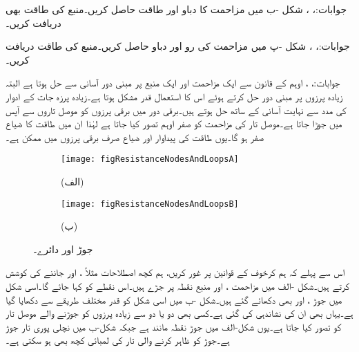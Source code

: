 جوابات:، ، 
شکل -ب میں مزاحمت کا دباو اور طاقت حاصل کریں۔منبع کی طاقت بھی دریافت کریں۔

جوابات:، ، 
شکل -پ میں مزاحمت کی رو اور دباو حاصل کریں۔منبع کی طاقت دریافت کریں۔

جوابات:، ، 
\FloatBarrier
{}
اوہم کے قانون سے ایک مزاحمت اور ایک منبع پر مبنی دور آسانی سے حل ہوتا ہے البتہ زیادہ  پرزوں پر مبنی دور حل کرتے ہوئے اس کا استعمال قدر مشکل ہوتا ہے۔زیادہ پرزہ جات کے ادوار  کی مدد سے نہایت آسانی کے ساتھ حل ہوتے ہیں۔برقی دور میں برقی پرزوں کو موصل تاروں سے آپس میں جوڑا جاتا ہے۔موصل تار کی مزاحمت کو صفر اوہم تصور کیا جاتا ہے لہٰذا ان میں طاقت کا ضیاع صفر ہو گا۔یوں طاقت کی  پیداوار اور ضیاع صرف برقی پرزوں میں ممکن ہے۔

\begin{figure}
\centering
\begin{subfigure}{0.5\textwidth}
\centering
\texttt{[image: figResistanceNodesAndLoopsA]}
\caption*{(الف)}
\end{subfigure}%
%
\begin{subfigure}{0.5\textwidth}
\centering
\texttt{[image: figResistanceNodesAndLoopsB]}
\caption*{(ب)}%
\end{subfigure}
\caption{جوڑ اور دائرے۔}
\label{شکل_مزاحمتی_جوڑ_دائرہ}
\end{figure}

اس سے پہلے کہ ہم کرخوف کے قوانین پر غور کریں، ہم کچھ اصطلاحات مثلاً ،  اور  جاننے کی کوشش کرتے ہیں۔شکل -الف میں مزاحمت ،  اور منبع  نقطہ  پر جڑے ہیں۔اس نقطے کو   کہا جائے گا۔اسی شکل میں جوڑ ،  اور  بھی دکھائے گئے ہیں۔شکل -ب میں اسی شکل کو قدر مختلف طریقے سے  دکھایا گیا ہے۔یہاں بھی ان  کی نشاندہی کی گئی ہے۔کسی بھی دو یا دو سے زیادہ پرزوں کو جوڑنے والے موصل تار کو  تصور کیا جاتا ہے۔یوں شکل-الف میں جوڑ  نقطہ مانند ہے جبکہ شکل-ب میں نچلی پوری تار جوڑ  ہے۔جوڑ کو ظاہر کرنے والی تار کی لمبائی کچھ بھی ہو سکتی ہے۔

